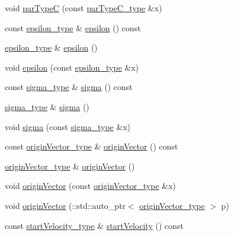 \begin{DoxyCompactItemize}
\item 
void \hyperlink{classcuboid__t_a7eac87c8db11eb19bc4873220d366831}{par\-Type\-C} (const \hyperlink{classcuboid__t_a162caafd069fa127809bb2d573c752c5}{par\-Type\-C\-\_\-type} \&x)
\item 
const \hyperlink{classcuboid__t_ac4a981a7963b1b2105d448cf42ab1230}{epsilon\-\_\-type} \& \hyperlink{classcuboid__t_acd8d400db715227486dd790cd6d94b6e}{epsilon} () const 
\item 
\hyperlink{classcuboid__t_ac4a981a7963b1b2105d448cf42ab1230}{epsilon\-\_\-type} \& \hyperlink{classcuboid__t_af1d9a282a756b593b4fa62beb59fdc82}{epsilon} ()
\item 
void \hyperlink{classcuboid__t_acdacc4d702d49a86c06cc2b1578d8bab}{epsilon} (const \hyperlink{classcuboid__t_ac4a981a7963b1b2105d448cf42ab1230}{epsilon\-\_\-type} \&x)
\item 
const \hyperlink{classcuboid__t_ae1de9c7b1d2b2a9098de31c546c0ff83}{sigma\-\_\-type} \& \hyperlink{classcuboid__t_ae13a7e732dc3c3ae94d8aaffba7ee617}{sigma} () const 
\item 
\hyperlink{classcuboid__t_ae1de9c7b1d2b2a9098de31c546c0ff83}{sigma\-\_\-type} \& \hyperlink{classcuboid__t_a0a25741d3a40cffb89c4b8f62fd5b302}{sigma} ()
\item 
void \hyperlink{classcuboid__t_aa8ad42d35fb7d27f8e3a476e75e02b40}{sigma} (const \hyperlink{classcuboid__t_ae1de9c7b1d2b2a9098de31c546c0ff83}{sigma\-\_\-type} \&x)
\item 
const \hyperlink{classcuboid__t_a20d67505efc00dc82947ce881aec1e76}{origin\-Vector\-\_\-type} \& \hyperlink{classcuboid__t_afe1995f8cfc6ba9a2297f40ff819cbf4}{origin\-Vector} () const 
\item 
\hyperlink{classcuboid__t_a20d67505efc00dc82947ce881aec1e76}{origin\-Vector\-\_\-type} \& \hyperlink{classcuboid__t_a4694704c1be9385729b17f5c5ab76c4d}{origin\-Vector} ()
\item 
void \hyperlink{classcuboid__t_a4e4a379837eb1a37609203e890977a60}{origin\-Vector} (const \hyperlink{classcuboid__t_a20d67505efc00dc82947ce881aec1e76}{origin\-Vector\-\_\-type} \&x)
\item 
void \hyperlink{classcuboid__t_a202c8b82852eed4c25905e251105079d}{origin\-Vector} (\-::std\-::auto\-\_\-ptr$<$ \hyperlink{classcuboid__t_a20d67505efc00dc82947ce881aec1e76}{origin\-Vector\-\_\-type} $>$ p)
\item 
const \hyperlink{classcuboid__t_a7b9bd2a7888abc4b08f6f4e91ac9a81f}{start\-Velocity\-\_\-type} \& \hyperlink{classcuboid__t_aa2d8956335c51c61b3d24655faaef8e9}{start\-Velocity} () const 

\end{DoxyCompactItemize}
